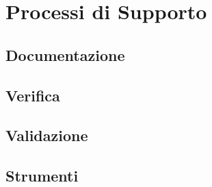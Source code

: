 \section{Processi di Supporto}
	\subsection{Documentazione}
	\subsection{Verifica}
	\subsection{Validazione}
	\subsection{Strumenti}